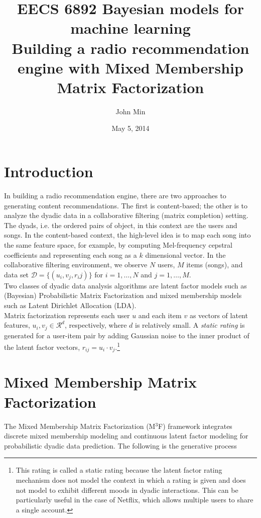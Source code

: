\documentclass{article}
\author{John Min}
\title{\textbf{EECS 6892 Bayesian models for machine learning \\  Building a radio recommendation engine with Mixed Membership Matrix Factorization}}
\begin{document}
\date{May 5, 2014}

\maketitle

\pagebreak

\section{Introduction}
In building a radio recommendation engine, there are two approaches to generating content recommendations.  The first is content-based; the other is to analyze the dyadic data in a collaborative filtering (matrix completion) setting. The dyads, i.e. the ordered pairs of object, in this context are the users and songs.  In the content-based context, the high-level idea is to map each song into the same feature space, for example, by computing Mel-frequency cepstral coefficients and representing each song as a $k$ dimensional vector. In the collaborative filtering environment, we observe $N$ users, $M$ items (songs), and data set $\mathcal{D} = \{(u_i, v_j, r_ij)\}$ for $i=1, \ldots, N$ and $j=1, \ldots, M$. \\

\noindent
Two classes of dyadic data analysis algorithms are latent factor models such as (Bayesian) Probabilistic Matrix Factorization and mixed membership models such as Latent Dirichlet Allocation (LDA).\\

\noindent
Matrix factorization represents each user $u$ and each item $v$ as vectors of latent features, $u_i, v_j \in \mathcal{R}^d$, respectively, where $d$ is relatively small. A \emph{static rating} is generated for a user-item pair by adding Gaussian noise to the inner product of the latent factor vectors, $r_{ij} = u_i \cdot v_j$.\footnote{This rating is called a static rating because the latent factor rating mechanism does not model the context in which a rating is given and does not model to exhibit different moods in dyadic interactions. This can be particularly useful in the case of Netflix, which allows multiple users to share a single account.}


\section{Mixed Membership Matrix Factorization}
The Mixed Membership Matrix Factorization (M$^3$F) framework integrates discrete mixed membership modeling and continuous latent factor modeling for probabilistic dyadic data prediction.  The following is the generative process
\end{document}
